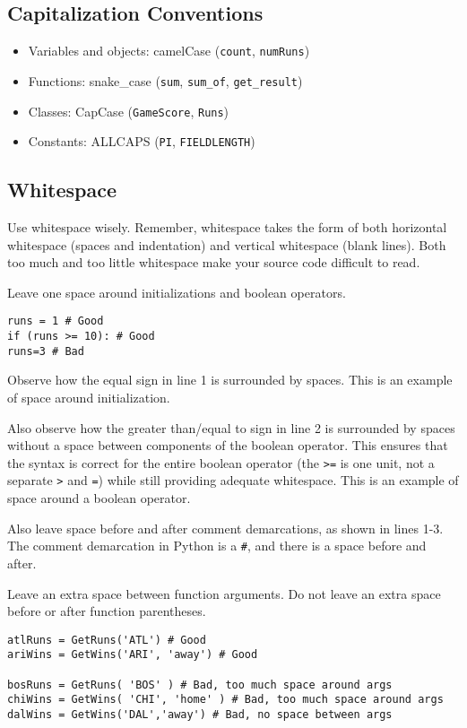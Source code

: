 \subsection*{Capitalization Conventions}
\begin{itemize}
    \item Variables and objects: camelCase (\verb|count|, \verb|numRuns|)
    \item Functions: snake\_case (\verb|sum|, \verb|sum_of|, \verb|get_result|)
    \item Classes: CapCase (\verb|GameScore|, \verb|Runs|)
    \item Constants: ALLCAPS (\verb|PI|, \verb|FIELDLENGTH|)
\end{itemize}
\subsection*{Whitespace}
Use whitespace wisely. Remember, whitespace takes the form of both horizontal whitespace (spaces and indentation) and vertical whitespace (blank lines). Both too much and too little whitespace make your source code difficult to read.

Leave one space around initializations and boolean operators.

\begin{lstlisting}[style=pippython]
runs = 1 # Good
if (runs >= 10): # Good
runs=3 # Bad
\end{lstlisting}

Observe how the equal sign in line 1 is surrounded by spaces. This is an example of space around initialization.

Also observe how the greater than/equal to sign in line 2 is surrounded by spaces without a space between components of the boolean operator. This ensures that the syntax is correct for the entire boolean operator (the \verb|>=| is one unit, not a separate \verb|>| and \verb|=|) while still providing adequate whitespace. This is an example of space around a boolean operator.

Also leave space before and after comment demarcations, as shown in lines 1-3. The comment demarcation in Python is a \verb|#|, and there is a space before and after.

Leave an extra space between function arguments. Do not leave an extra space before or after function parentheses.

\begin{lstlisting}[style=pippython]
atlRuns = GetRuns('ATL') # Good
ariWins = GetWins('ARI', 'away') # Good
 
bosRuns = GetRuns( 'BOS' ) # Bad, too much space around args
chiWins = GetWins( 'CHI', 'home' ) # Bad, too much space around args
dalWins = GetWins('DAL','away') # Bad, no space between args
\end{lstlisting}

